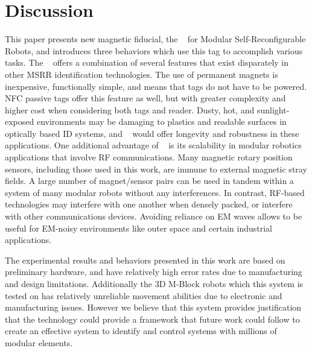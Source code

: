 \section{Discussion}
\label{sec:Discussion}
This paper presents new magnetic fiducial, the \tagName~  for Modular Self-Reconfigurable Robots, and introduces three behaviors which use this tag to accomplish various tasks. The \tagNamePlural~ offers a combination of several features that exist disparately in other MSRR identification technologies. The use of permanent magnets is inexpensive, functionally simple, and means that tags do not have to be powered. NFC passive tags offer this feature as well, but with greater complexity and higher cost when considering both tags and reader. Dusty, hot, and sunlight-exposed environments may be damaging to plastics and readable surfaces in optically based ID systems, and \tagName~ would offer longevity and robustness in these applications. One additional advantage of \tagName~ is its scalability in modular robotics applications that involve RF communications. Many magnetic rotary position sensors, including those used in this work, are immune to external magnetic stray fields. A large number of magnet/sensor pairs can be used in tandem within a system of many modular robots without any interferences. In contrast, RF-based technologies may interfere with one another when densely packed, or interfere with other communications devices. Avoiding reliance on EM waves allows \tagName to be useful for EM-noisy environments like outer space and certain industrial applications.

The experimental results and behaviors presented in this work are based on preliminary hardware, and have relatively high error rates due to manufacturing and design limitations. Additionally the 3D M-Block robots which this system is tested on has relatively unreliable movement abilities due to electronic and manufacturing issues. However we believe that this system provides justification that the technology could provide a framework that future work could follow to create an effective system to identify and control systems with millions of modular elements.

